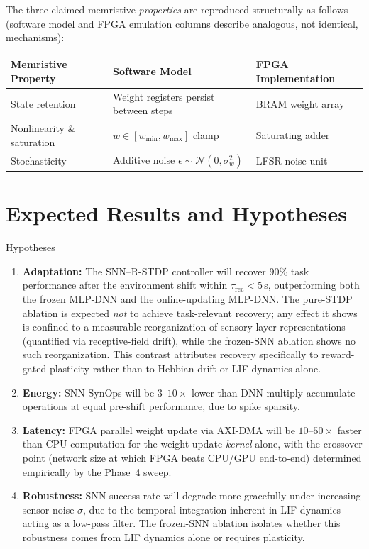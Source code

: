 \documentclass[11pt,a4paper]{article}
\begin{document}
The three claimed memristive \emph{properties} are reproduced structurally as follows
(software model and FPGA emulation columns describe analogous, not identical,
mechanisms):

\begin{center}
\renewcommand{\arraystretch}{1.3}
\begin{tabular}{@{}lll@{}}
  \toprule
  \textbf{Memristive Property} & \textbf{Software Model} & \textbf{FPGA Implementation} \\
  \midrule
  State retention & Weight registers persist between steps & BRAM weight array \\
  Nonlinearity \& saturation & $w \in [w_{\min}, w_{\max}]$ clamp & Saturating adder \\
  Stochasticity & Additive noise $\epsilon \sim \mathcal{N}(0, \sigma_w^2)$ & LFSR noise unit \\
  \bottomrule
\end{tabular}
\end{center}

\section{Expected Results and Hypotheses}

\begin{keybox}{Hypotheses}
\begin{enumerate}[label=\textbf{H\arabic*.}, leftmargin=*, itemsep=4pt]
  \item \textbf{Adaptation:} The SNN--R-STDP controller will recover 90\% task
        performance after the environment shift within $\tau_{\mathrm{rec}} < 5$\,s,
        outperforming both the frozen MLP-DNN and the online-updating MLP-DNN. The
        pure-STDP ablation is expected \emph{not} to achieve task-relevant recovery;
        any effect it shows is confined to a measurable reorganization of sensory-layer
        representations (quantified via receptive-field drift), while the frozen-SNN
        ablation shows no such reorganization. This contrast attributes recovery
        specifically to reward-gated plasticity rather than to Hebbian drift or LIF
        dynamics alone.
  \item \textbf{Energy:} SNN SynOps will be $3$--$10\times$ lower than DNN
        multiply-accumulate operations at equal pre-shift performance, due to spike
        sparsity.
  \item \textbf{Latency:} FPGA parallel weight update via AXI-DMA will be
        $10$--$50\times$ faster than CPU computation for the weight-update
        \emph{kernel} alone, with the crossover point (network size at which FPGA
        beats CPU/GPU end-to-end) determined empirically by the Phase~4 sweep.
  \item \textbf{Robustness:} SNN success rate will degrade more gracefully under
        increasing sensor noise $\sigma$, due to the temporal integration inherent in
        LIF dynamics acting as a low-pass filter. The frozen-SNN ablation isolates
        whether this robustness comes from LIF dynamics alone or requires plasticity.
\end{enumerate}
\end{keybox}
\end{document}
